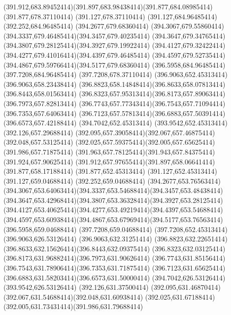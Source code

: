 {{	\curveto(391.912,683.89452414)(391.897,683.98438414)(391.877,684.08985414)
	\lineto(391.877,678.37110414)
	\lineto(391.127,678.37110414)
	\lineto(391.127,684.96485414)
	\lineto(392.252,684.96485414)
	\lineto(394.2677,679.68360414)
	\curveto(394.3067,679.55860414)(394.3337,679.46485414)(394.3457,679.40235414)
	\curveto(394.3647,679.34765414)(394.3807,679.28125414)(394.3927,679.19922414)
	\curveto(394.4127,679.32422414)(394.4277,679.41016414)(394.4397,679.46485414)
	\curveto(394.4597,679.52735414)(394.4867,679.59766414)(394.5177,679.68360414)
	\lineto(396.5958,684.96485414)
	\lineto(397.7208,684.96485414)
	\lineto(397.7208,678.37110414)
	\closepath
	\moveto(396.9063,652.45313414)
	\lineto(396.9063,658.23438414)
	\curveto(396.8823,658.14848414)(396.8633,658.07813414)(396.8443,658.01563414)
	\curveto(396.8323,657.95313414)(396.8173,657.89063414)(396.7973,657.82813414)
	\curveto(396.7743,657.77343414)(396.7543,657.71094414)(396.7353,657.64063414)
	\curveto(396.7123,657.57813414)(396.6883,657.50391414)(396.6573,657.42188414)
	\lineto(394.7042,652.45313414)
	\lineto(393.9542,652.45313414)
	\lineto(392.126,657.29688414)
	\curveto(392.095,657.39058414)(392.067,657.46875414)(392.048,657.53125414)
	\curveto(392.025,657.59375414)(392.005,657.65625414)(391.986,657.71875414)
	\curveto(391.963,657.78125414)(391.943,657.84375414)(391.924,657.90625414)
	\curveto(391.912,657.97655414)(391.897,658.06641414)(391.877,658.17188414)
	\lineto(391.877,652.45313414)
	\lineto(391.127,652.45313414)
	\lineto(391.127,659.04688414)
	\lineto(392.252,659.04688414)
	\lineto(394.2677,653.76563414)
	\curveto(394.3067,653.64063414)(394.3337,653.54688414)(394.3457,653.48438414)
	\curveto(394.3647,653.42968414)(394.3807,653.36328414)(394.3927,653.28125414)
	\curveto(394.4127,653.40625414)(394.4277,653.49219414)(394.4397,653.54688414)
	\curveto(394.4597,653.60938414)(394.4867,653.67969414)(394.5177,653.76563414)
	\lineto(396.5958,659.04688414)
	\lineto(397.7208,659.04688414)
	\lineto(397.7208,652.45313414)
	\closepath
	\moveto(396.9063,626.53126414)
	\lineto(396.9063,632.31251414)
	\curveto(396.8823,632.22651414)(396.8633,632.15626414)(396.8443,632.09375414)
	\curveto(396.8323,632.03125414)(396.8173,631.96882414)(396.7973,631.90626414)
	\curveto(396.7743,631.85156414)(396.7543,631.78906414)(396.7353,631.71875414)
	\curveto(396.7123,631.65625414)(396.6883,631.58203414)(396.6573,631.50000414)
	\lineto(394.7042,626.53126414)
	\lineto(393.9542,626.53126414)
	\lineto(392.126,631.37500414)
	\curveto(392.095,631.46870414)(392.067,631.54688414)(392.048,631.60938414)
	\curveto(392.025,631.67188414)(392.005,631.73431414)(391.986,631.79688414)
}}
